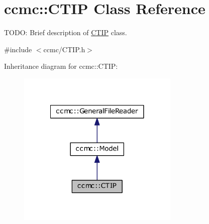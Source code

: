 \hypertarget{classccmc_1_1_c_t_i_p}{\section{ccmc\-:\-:C\-T\-I\-P Class Reference}
\label{classccmc_1_1_c_t_i_p}
}


T\-O\-D\-O\-: Brief description of \hyperlink{classccmc_1_1_c_t_i_p}{C\-T\-I\-P} class.  




{\ttfamily \#include $<$ccmc/\-C\-T\-I\-P.\-h$>$}



Inheritance diagram for ccmc\-:\-:C\-T\-I\-P\-:
\nopagebreak
\begin{figure}[H]
\begin{center}
\leavevmode
\includegraphics[width=218pt]{classccmc_1_1_c_t_i_p__inherit__graph}
\end{center}
\end{figure}


